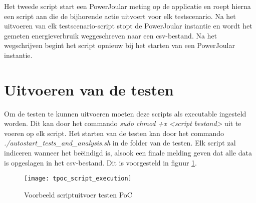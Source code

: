 Het tweede script start een PowerJoular meting op de applicatie en roept hierna een script aan die de bijhorende actie uitvoert voor elk testscenario. Na het uitvoeren van elk testscenario-script stopt de PowerJoular instantie en wordt het gemeten energieverbruik weggeschreven naar een csv-bestand. Na het wegschrijven begint het script opnieuw bij het starten van een PowerJoular instantie.\\

\section{Uitvoeren van de testen}
Om de testen te kunnen uitvoeren moeten deze scripts als executable ingesteld worden. Dit kan door het commando \textit{sudo chmod +x <script bestand>} uit te voeren op elk script. Het starten van de testen kan door het commando \textit{./autostart\_tests\_and\_analysis.sh} in de folder van de testen. Elk script zal indiceren wanneer het beëindigd is, alsook een finale melding geven dat alle data is opgeslagen in het csv-bestand. Dit is voorgesteld in figuur \ref{tpoc_script_output}.\\  %
\begin{figure}[h!]
    \texttt{[image: tpoc\_script\_execution]}
    \centering
    \caption{Voorbeeld scriptuitvoer testen PoC}
    \label{tpoc_script_output}
\end{figure}